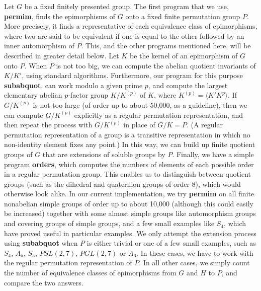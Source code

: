 Let  $G$  be a fixed finitely presented group.
The first program that we use, {\bf permim}, finds the epimorphisms of  $G$ 
onto a fixed finite permutation group  $P$. More precisely, it finds a
representative of each equivalence class of epimorphisms, where two are said
to be equivalent if one is equal to the other followed by an inner
automorphism of  $P$.  This, and the other programs mentioned here, will be
described in greater detail below.  Let  $K$  be the kernel of an epimorphism
of  $G$  onto  $P$.  When  $P$  is not too big, we can compute the abelian
quotient invariants of  $K/K'$, using standard algorithms. Furthermore, our
program for this purpose {\bf subabquot}, can work modulo a given prime  $p$,
and compute the largest elementary abelian  $p$-factor group  $K/K^{(p)}$  of 
$K$, where $K^{(p)} = \langle K'K^p \rangle$. If $G/K^{(p)}$ is not too large
(of order up to about 50,000, as a guideline), then we can compute $G/K^{(p)}$ explicitly
as a regular permutation representation, and then repeat the process with 
$G/K^{(p)}$ in place of $G/K = P$. (A regular permutation representation of a
group is a transitive representation in which no non-identity element
fixes any point.) In this way, we can build up finite quotient
groups of $G$ that are extensions of soluble groups by $P$.  Finally, we have a
simple program {\bf orders},  which computes the numbers of elements of each
possible order in a regular permutation group.  This enables us to distinguish
between quotient groups (such as the dihedral and quaternion groups of order 8),
which would otherwise look alike. In our current implementation, we try
{\bf permim} on all finite nonabelian simple groups of order up to about 10,000
(although this could easily be increased) together with some almost simple
groups like automorphism groups and covering groups of simple groups,
and a few small examples like $S_4$, which have proved useful in
particular examples. We only
attempt the extension process using {\bf subabquot} when $P$ is either
trivial or one of a few small examples, such as
$S_4$, $A_5$, $S_5$, $PSL(2,7)$, 
$PGL(2,7)$ or $A_6$.  In these cases, we have to work with the regular
permutation representation of $P$. In all other cases, we simply count the
number of equivalence classes of epimorphisms from $G$ and $H$ to $P$,
and compare the two answers.

